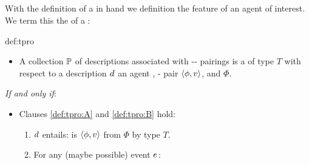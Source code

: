 \subsection{}
\label{sec:tpros}


\begin{note}
  With the definition of a  in hand we definition the feature of an agent \tCV{} of interest.
  We term this  the \emph{\tpro{}} of a \torN{}:

  \begin{rdefinition}{def:tpro}{}%
    \vspace{-\baselineskip}
    \begin{itemize}
    \item
      A collection \(\mathbb{P}\) of descriptions associated with -- pairings is a \emph{\tpro{}} of type \(T\) with respect to a description \(d\sb{}\) an agent \vAgent{}, - pair \(\langle\phi, v\rangle\), and \pool{} \(\Phi\).
    \end{itemize}

    \emph{If and only if}:

    \begin{itemize}
    \item
      Clauses \ref{def:tpro:A} and \ref{def:tpro:B} hold:

      \begin{enumerate}[label=\Alph*., ref=\Alph*]
      \item
        \label{def:tpro:A}
        \(d\sb{}\) entails: \vAgent{} is \tCV{} \(\langle\phi, v\rangle\) from \(\Phi\) by type \(T\).
      \item
        \label{def:tpro:B}
        For any (maybe possible) event \(e\sb{}\):
      \end{enumerate}
    \end{itemize}
    \vspace{-\baselineskip}
  \end{rdefinition}


\end{note}
